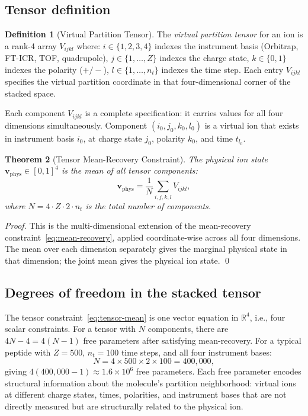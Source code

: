 \documentclass[twocolumn,10pt,a4paper]{article}
\theoremstyle{thmstyle}
\newtheorem{theorem}{Theorem}[section]
\theoremstyle{definition}
\newtheorem{definition}[theorem]{Definition}
\theoremstyle{remark}
\newcommand{\R}{\mathbb{R}}
\begin{document}
\subsection{Tensor definition}

\begin{definition}[Virtual Partition Tensor]
\label{def:tensor}
The \emph{virtual partition tensor} for an ion is a rank-4 array
$V_{ijkl}$ where:
$i \in \{1,2,3,4\}$ indexes the instrument basis
(Orbitrap, FT-ICR, TOF, quadrupole),
$j \in \{1,\ldots,Z\}$ indexes the charge state,
$k \in \{0,1\}$ indexes the polarity ($+/-$),
$l \in \{1,\ldots,n_t\}$ indexes the time step.
Each entry $V_{ijkl}$ specifies the virtual partition coordinate in that
four-dimensional corner of the stacked space.
\end{definition}

Each component $V_{ijkl}$ is a complete specification: it carries values
for all four dimensions simultaneously. Component $(i_0, j_0, k_0, l_0)$
is a virtual ion that exists in instrument basis $i_0$, at charge state
$j_0$, polarity $k_0$, and time $t_{l_0}$.

\begin{theorem}[Tensor Mean-Recovery Constraint]
\label{thm:tensor-constraint}
The physical ion state $\mathbf{v}_{\text{phys}} \in [0,1]^4$ is the
mean of all tensor components:
\begin{equation}
\mathbf{v}_{\text{phys}} = \frac{1}{N}\sum_{i,j,k,l} V_{ijkl},
\label{eq:tensor-mean}
\end{equation}
where $N = 4 \cdot Z \cdot 2 \cdot n_t$ is the total number of components.
\end{theorem}

\begin{proof}
This is the multi-dimensional extension of the mean-recovery
constraint~\eqref{eq:mean-recovery}, applied coordinate-wise across all
four dimensions. The mean over each dimension separately gives the
marginal physical state in that dimension; the joint mean gives the
physical ion state. \qed
\end{proof}

\subsection{Degrees of freedom in the stacked tensor}

The tensor constraint~\eqref{eq:tensor-mean} is one vector equation in
$\R^4$, i.e., four scalar constraints. For a tensor with $N$ components,
there are $4N - 4 = 4(N-1)$ free parameters after satisfying
mean-recovery. For a typical peptide with $Z = 500$, $n_t = 100$
time steps, and all four instrument bases:
\begin{equation}
N = 4 \times 500 \times 2 \times 100 = 400{,}000,
\label{eq:N}
\end{equation}
giving $4(400{,}000 - 1) \approx 1.6 \times 10^6$ free parameters.
Each free parameter encodes structural information about the molecule's
partition neighborhood: virtual ions at different charge states, times,
polarities, and instrument bases that are not directly measured but are
structurally related to the physical ion.
\end{document}
